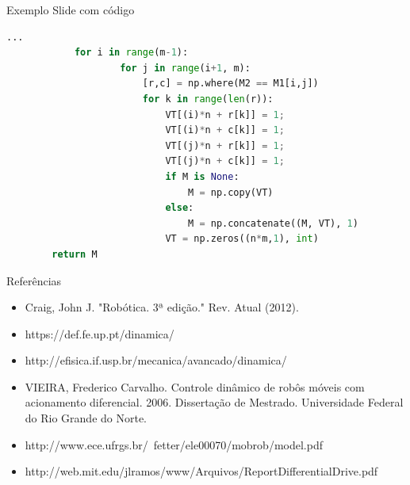 \documentclass{beamer}
\begin{document}
\begin{frame}[fragile]{Exemplo Slide com código}

	\begin{lstlisting}[language=Python]
			... 
			for i in range(m-1):
					for j in range(i+1, m):
						[r,c] = np.where(M2 == M1[i,j])
						for k in range(len(r)):
							VT[(i)*n + r[k]] = 1;
							VT[(i)*n + c[k]] = 1;
							VT[(j)*n + r[k]] = 1;
							VT[(j)*n + c[k]] = 1;
							if M is None:
								M = np.copy(VT)
							else:
								M = np.concatenate((M, VT), 1)
							VT = np.zeros((n*m,1), int)
		return M
	\end{lstlisting}
\end{frame}




\begin{frame}[t]{Referências}
    \begin{itemize}
        \item Craig, John J. "Robótica. 3ª edição." Rev. Atual (2012).
        \item https://def.fe.up.pt/dinamica/ 
        \item http://efisica.if.usp.br/mecanica/avancado/dinamica/
        \item VIEIRA, Frederico Carvalho. Controle dinâmico de robôs móveis com acionamento diferencial. 2006. Dissertação de Mestrado. Universidade Federal do Rio Grande do Norte.
        \item http://www.ece.ufrgs.br/~fetter/ele00070/mobrob/model.pdf
        \item http://web.mit.edu/jlramos/www/Arquivos/ReportDifferentialDrive.pdf

\end{itemize}
\end{frame}
\end{document}
